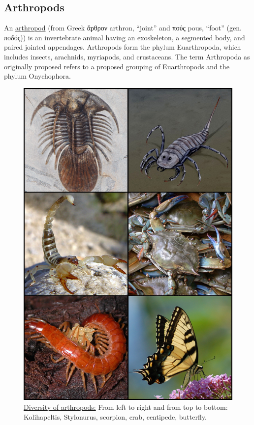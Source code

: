 \hypertarget{arthropods}{%
\subsection{Arthropods}\label{arthropods}}

An \href{https://en.wikipedia.org/wiki/Arthropod}{arthropod} (from Greek ἄρθρον arthron, ``joint'' and πούς pous, ``foot'' (gen. ποδός)) is an invertebrate animal having an exoskeleton, a segmented body, and paired jointed appendages. Arthropods form the phylum Euarthropoda, which includes insects, arachnids, myriapods, and crustaceans. The term Arthropoda as originally proposed refers to a proposed grouping of Euarthropods and the phylum Onychophora.



\begin{figure}

{\centering \includegraphics[width=0.7\linewidth]{./figures/animals/Arthropoda} 

}

\caption{\href{https://commons.wikimedia.org/wiki/File:Arthropoda.jpg}{Diversity of arthropods:} From left to right and from top to bottom: Kolihapeltis, Stylonurus, scorpion, crab, centipede, butterfly.}\label{fig:arthropoddiversity}
\end{figure}

